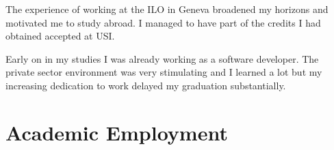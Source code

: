 \documentclass[11pt,a4paper]{moderncv}
\begin{document}
{}
{The experience of working at the ILO in Geneva broadened my horizons and motivated me to study abroad. I managed to have part of the credits I had obtained accepted at USI.}


{}
{Early on in my studies I was already working as a software developer.
The private sector environment was very stimulating and I learned a lot
but my increasing dedication to work delayed my graduation substantially.}


\section{Academic Employment}
\end{document}
